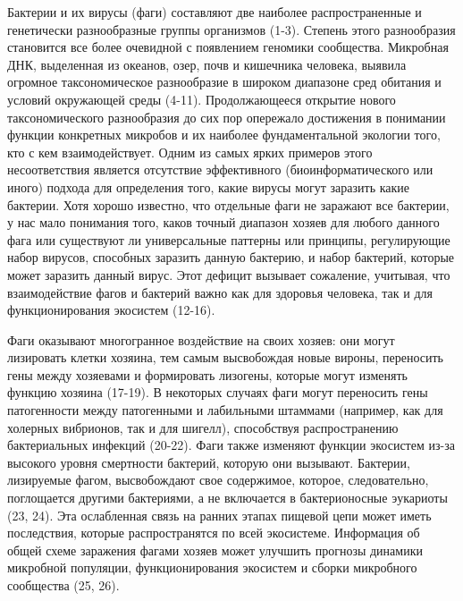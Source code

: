 \documentclass[a4paper,12pt]{article}
\begin{document}
    \par{Бактерии и их вирусы (фаги) составляют две наиболее распространенные и генетически разнообразные группы
    организмов (1-3). Степень этого разнообразия становится все более очевидной с появлением геномики сообщества.
    Микробная ДНК, выделенная из океанов, озер, почв и кишечника человека, выявила огромное таксономическое
    разнообразие в широком диапазоне сред обитания и условий окружающей среды (4-11). Продолжающееся открытие нового
    таксономического разнообразия до сих пор опережало достижения в понимании функции конкретных микробов и их наиболее
    фундаментальной экологии того, кто с кем взаимодействует. Одним из самых ярких примеров этого несоответствия
    является отсутствие эффективного (биоинформатического или иного) подхода для определения того, какие вирусы могут
    заразить какие бактерии. Хотя хорошо известно, что отдельные фаги не заражают все бактерии, у нас мало понимания
    того, каков точный диапазон хозяев для любого данного фага или существуют ли универсальные паттерны или принципы,
    регулирующие набор вирусов, способных заразить данную бактерию, и набор бактерий, которые может заразить данный
    вирус. Этот дефицит вызывает сожаление, учитывая, что взаимодействие фагов и бактерий важно как для здоровья
    человека, так и для функционирования экосистем (12-16).}
    
    \par{Фаги оказывают многогранное воздействие на своих хозяев: они могут лизировать клетки хозяина, тем самым
    высвобождая новые вироны, переносить гены между хозяевами и формировать лизогены, которые могут изменять функцию
    хозяина (17-19). В некоторых случаях фаги могут переносить гены патогенности между патогенными и лабильными
    штаммами (например, как для холерных вибрионов, так и для шигелл), способствуя распространению бактериальных
    инфекций (20-22). Фаги также изменяют функции экосистем из-за высокого уровня смертности бактерий, которую они
    вызывают. Бактерии, лизируемые фагом, высвобождают свое содержимое, которое, следовательно, поглощается другими
    бактериями, а не включается в бактерионосные эукариоты (23, 24). Эта ослабленная связь на ранних этапах пищевой
    цепи может иметь последствия, которые распространятся по всей экосистеме. Информация об общей схеме заражения
    фагами хозяев может улучшить прогнозы динамики микробной популяции, функционирования экосистем и сборки микробного
    сообщества (25, 26).}
    
\end{document}
